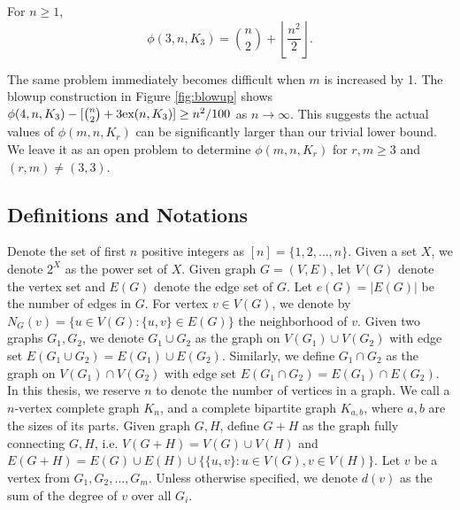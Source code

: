 \begin{theorem}\label{thm:triangles}
  For $n \geq 1$,
  \[
    \phi(3, n, K_3) = \binom{n}{2} + \left\lfloor \frac{n^2}{2} \right\rfloor.
  \]
\end{theorem}

The same problem immediately becomes difficult when $m$ is increased by 1. The blowup construction in Figure \ref{fig:blowup} shows $\phi(4, n, K_3) - [\binom{n}{2} + 3\textnormal{ex}(n, K_3)] \geq n^2/100$ as $n \to \infty$. This suggests the actual values of $\phi(m, n, K_r)$ can be significantly larger than our trivial lower bound. We leave it as an open problem to determine $\phi(m, n, K_r)$ for $r, m \geq 3$ and $(r, m) \neq (3, 3)$.

\subsection{Definitions and Notations}

Denote the set of first $n$ positive integers as $[n] = \{1, 2, \ldots, n\}$. Given a set $X$, we denote $2^X$ as the power set of $X$. Given graph $G = (V, E)$, let $V(G)$ denote the vertex set and $E(G)$ denote the edge set of $G$. Let $e(G) = |E(G)|$ be the number of edges in $G$. For vertex $v \in V(G)$, we denote by $N_G(v) = \{u \in V(G) : \{u, v\} \in E(G)\}$ the neighborhood of $v$. Given two graphs $G_1, G_2$, we denote $G_1 \cup G_2$ as the graph on $V(G_1) \cup V(G_2)$ with edge set $E(G_1 \cup G_2) = E(G_1) \cup E(G_2)$. Similarly, we define $G_1 \cap G_2$ as the graph on $V(G_1) \cap V(G_2)$ with edge set $E(G_1 \cap G_2) = E(G_1) \cap E(G_2)$. In this thesis, we reserve $n$ to denote the number of vertices in a graph. We call a $n$-vertex complete graph $K_n$, and a complete bipartite graph $K_{a, b}$, where $a, b$ are the sizes of its parts. Given graph $G, H$, define $G + H$ as the graph fully connecting $G, H$, i.e. $V(G + H) = V(G) \cup V(H)$ and $E(G + H) = E(G) \cup E(H) \cup \{\{u, v\} : u \in V(G), v \in V(H)\}$. Let $v$ be a vertex from $G_1, G_2, \ldots, G_m$. Unless otherwise specified, we denote $d(v)$ as the sum of the degree of $v$ over all $G_i$.